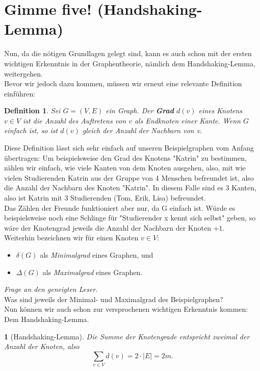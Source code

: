 \documentclass{article}
\newtheorem{definition}{Definition}
\theoremstyle{plain}
\newcommand{\thistheoremname}{}
\newtheorem{genericthm}[theorem]{\thistheoremname}
\newenvironment{namedthm}[1]
  {\renewcommand{\thistheoremname}{#1}
   \begin{genericthm}}
  {\end{genericthm}}
\begin{document}
\newpage
\section{Gimme five! (Handshaking-Lemma)}
Nun, da die nötigen Grundlagen gelegt sind, kann es auch schon mit der ersten wichtigen Erkenntnis in der Graphentheorie, nämlich dem Handshaking-Lemma, weitergehen.\\
\bigskip
Bevor wir jedoch dazu kommen, müssen wir erneut eine relevante Definition einführen:\\
\bigskip
\begin{definition} Sei \(G = (V, E)\) ein Graph. Der \textbf{Grad} \(d(v)\) eines Knotens \(v \in V\) ist die Anzahl des Auftretens von \(v\) als Endknoten einer Kante. Wenn \(G\) einfach ist, so ist \(d(v)\) gleich der Anzahl der Nachbarn von v.
\end{definition}
\bigskip
Diese Definition lässt sich sehr einfach auf unseren Beispielgraphen vom Anfang übertragen: Um beispielsweise den Grad des Knotens "Katrin" zu bestimmen, zählen wir einfach, wie viele Kanten von dem Knoten ausgehen, also, mit wie vielen Studierenden Katrin aus der Gruppe von 4 Menschen befreundet ist, also die Anzahl der Nachbarn des Knoten "Katrin". In diesem Falle sind es \(3\) Kanten, also ist Katrin mit 3 Studierenden (Tom, Erik, Lisa) befreundet.\\
Das Zählen der Freunde funktioniert aber nur, da G einfach ist. Würde es beispielsweise noch eine Schlinge für "Studierender x kennt sich selbst" geben, so wäre der Knotengrad jeweils die Anzahl der Nachbarn der Knoten \(+1\).\\
\bigskip
Weiterhin bezeichnen wir für einen Knoten \(v \in V\):
\begin{itemize}
	\item \(\delta(G)\) als \textit{Minimalgrad} eines Graphen, und
	\item \(\Delta(G)\) als \textit{Maximalgrad} eines Graphen.
\end{itemize}
\textit{Frage an den geneigten Leser.}\\
Was sind jeweils der Minimal- und Maximalgrad des Beispielgraphen?\\
\bigskip
Nun können wir auch schon zur versprochenen wichtigen Erkenntnis kommen: Dem Handshaking-Lemma.\\
\begin{namedthm}{Lemma}[Handshaking-Lemma]
Die Summe der Knotengrade entspricht zweimal der Anzahl der Knoten, also
\begin{equation*}
	\sum_{v \in V}d(v) = 2 \cdot |E| = 2m.
\end{equation*}
\end{namedthm}
\end{document}
